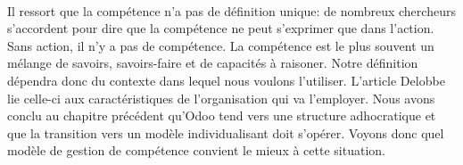 \paragraph{}Il ressort que la compétence n'a pas de définition unique: de nombreux chercheurs s'accordent pour dire que la compétence ne peut s'exprimer que dans l'action. Sans action, il n'y a pas de compétence. La compétence est le plus souvent un mélange de savoirs, savoirs-faire et de capacités à raisoner. Notre définition dépendra donc du contexte dans lequel nous voulons l'utiliser. L'article Delobbe\citep[pp.31]{delobbe} lie celle-ci aux caractéristiques de l'organisation qui va l'employer. Nous avons conclu au chapitre précédent qu'Odoo tend vers une structure adhocratique et que la transition vers un modèle individualisant doit s'opérer. Voyons donc quel modèle de gestion de compétence convient le mieux à cette situation.



